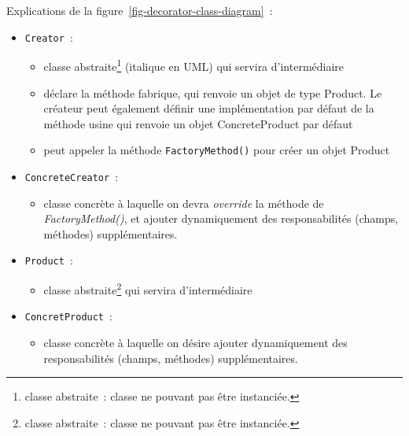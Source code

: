 \documentclass[a4paper,12pt]{article}
\begin{document}
\FloatBarrier
Explications de la figure~\ref{fig-decorator-class-diagram}~:
\begin{itemize}
\item \texttt{Creator}~:
	\begin{itemize}
	\item classe abstraite\footnote{classe abstraite~: classe ne pouvant pas être instanciée.} (italique en UML) qui servira d'intermédiaire
	\item déclare la méthode fabrique, qui renvoie un objet de type Product. Le créateur peut également définir une implémentation par défaut de la méthode usine qui renvoie un objet ConcreteProduct par défaut
	\item peut appeler la méthode \texttt{FactoryMethod()} pour créer un objet Product
\end{itemize}
\item \texttt{ConcreteCreator}~:
	\begin{itemize}
	\item classe concrète à laquelle on devra \textit{override} la méthode de \textit{FactoryMethod()}, et ajouter dynamiquement des responsabilités
(champs, méthodes) supplémentaires.
	\end{itemize}
\item \texttt{Product}~:
    \begin{itemize}
	\item classe abstraite\footnote{classe abstraite~: classe ne pouvant pas être instanciée.} qui servira d'intermédiaire
	\end{itemize}
\item \texttt{ConcretProduct}~:
    \begin{itemize}
	\item classe concrète à laquelle on désire ajouter dynamiquement des responsabilités
(champs, méthodes) supplémentaires.
	\end{itemize}
	

\end{itemize}
\end{document}
